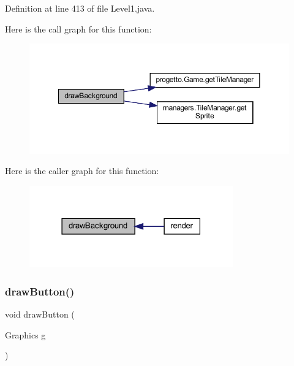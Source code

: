 Definition at line 413 of file Level1.\+java.

Here is the call graph for this function\+:\nopagebreak
\begin{figure}[H]
\begin{center}
\leavevmode
\includegraphics[width=350pt]{classscenes_1_1_level1_a62bcb07be9e39896e5837a9d396e7235_cgraph}
\end{center}
\end{figure}
Here is the caller graph for this function\+:\nopagebreak
\begin{figure}[H]
\begin{center}
\leavevmode
\includegraphics[width=249pt]{classscenes_1_1_level1_a62bcb07be9e39896e5837a9d396e7235_icgraph}
\end{center}
\end{figure}
\mbox{\label{classscenes_1_1_level1_a65768678909bc0512c6cb9780709ad38}} 
\subsubsection{\texorpdfstring{draw\+Button()}{drawButton()}}
{\footnotesize\ttfamily void draw\+Button (\begin{DoxyParamCaption}\item[{Graphics}]{g }\end{DoxyParamCaption})\hspace{0.3cm}{\ttfamily [private]}}



